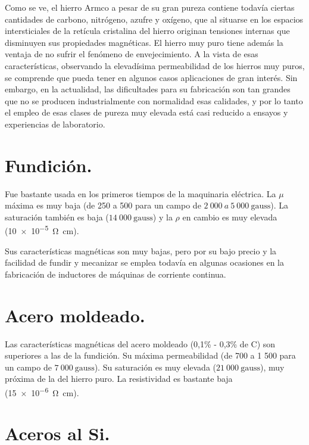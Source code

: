 \documentclass[12pt,a4paper]{article}
\begin{document}
Como se ve, el hierro Armco a pesar de su gran pureza contiene todavía ciertas cantidades de carbono, nitrógeno, azufre y oxígeno, que al situarse en los espacios intersticiales de la retícula cristalina del hierro originan tensiones internas que disminuyen sus propiedades magnéticas. El hierro muy puro tiene además la ventaja de no sufrir el fenómeno de envejecimiento. A la vista de esas características, observando la elevadísima permeabilidad de los hierros muy puros, se comprende que pueda tener en algunos casos aplicaciones de gran interés. Sin embargo, en la actualidad, las dificultades para su fabricación son tan grandes que no se producen industrialmente con normalidad esas calidades, y por lo tanto el empleo de esas clases de pureza muy elevada está casi reducido a ensayos y experiencias de laboratorio.

\section{Fundición.}

Fue bastante usada en los primeros tiempos de la maquinaria eléctrica. La $\mu$ máxima es muy baja (de 250 a 500 para un campo de $2\ 000\ a\ 5\ 000\ \mathrm{gauss}$). La saturación también es baja ($14\ 000\ \mathrm{gauss}$) y la $\rho$ en cambio es muy elevada (\SI{10e-5}{\ohm\centi\metre}). 

Sus características magnéticas son muy bajas, pero por su bajo precio y la facilidad de fundir y mecanizar se emplea todavía en algunas ocasiones en la fabricación de inductores de máquinas de corriente continua.

\section{Acero moldeado.}

Las características magnéticas del acero moldeado (0,1\% - 0,3\% de C) son superiores a las de la fundición. Su máxima permeabilidad (de 700 a 1 500  para un campo de $7\ 000\ \mathrm{gauss}$). Su saturación es muy elevada ($21\ 000\ \mathrm{gauss}$), muy próxima de la del hierro puro. La resistividad es bastante baja (\SI{15e-6}{\ohm\centi\metre}).

\section{Aceros al Si.}
\end{document}
